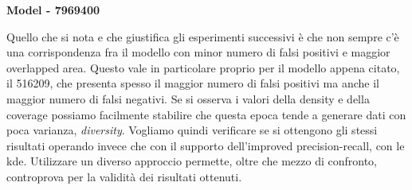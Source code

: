 \begin{table}[h!]
    \textbf{Model - 7969400}
    \centering
    \caption{I risultati ottenuti con l'identificazione dei falsi positivi tramite supporto (indicata con OA l'Overlapped Area)}
\end{table}

Quello che si nota e che giustifica gli esperimenti successivi è che non sempre c'è una corrispondenza fra il modello con minor numero di falsi positivi e maggior overlapped area. Questo vale in particolare proprio per il modello appena citato, il 516209, che presenta spesso il maggior numero di falsi positivi ma anche il maggior numero di falsi negativi. 
Se si osserva i valori della density e della coverage possiamo facilmente stabilire che questa epoca tende a generare dati con poca varianza, \textit{diversity}. Vogliamo quindi verificare se si ottengono gli stessi risultati operando invece che con il supporto dell'improved precision-recall, con le kde.
Utilizzare un diverso approccio permette, oltre che mezzo di confronto, controprova per la validità dei risultati ottenuti. 

